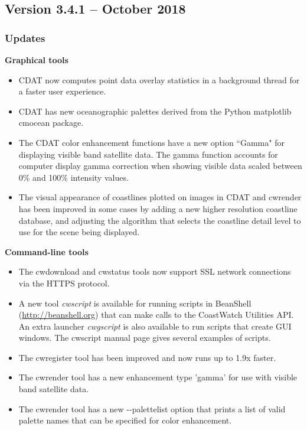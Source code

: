 \subsection*{Version 3.4.1 -- October 2018}

\subsubsection*{ Updates}

\hspace{0.4cm} {\bf Graphical tools}
\begin{itemize}

  \item CDAT now computes point data overlay statistics in a background thread
  for a faster user experience.

  \item CDAT has new oceanographic palettes derived from the Python matplotlib
  cmocean package.

  \item The CDAT color enhancement functions have a new option ``Gamma" for
  displaying visible band satellite data.  The gamma function accounts for
  computer display gamma correction when showing visible data scaled between
  0\% and 100\% intensity values.

  \item The visual appearance of coastlines plotted on images in CDAT and
  cwrender has been improved in some cases by adding a new higher
  resolution coastline database, and adjusting the algorithm that selects
  the coastline detail level to use for the scene being displayed.

\end{itemize}

\hspace{0.4cm} {\bf Command-line tools}
\begin{itemize}

    \item The cwdownload and cwstatus tools now support SSL network connections
    via the HTTPS protocol.

    \item A new tool {\em cwscript} is available for running scripts in
    BeanShell (\url{http://beanshell.org}) that can make calls to the
    CoastWatch Utilities API.  An extra launcher {\em cwgscript}
    is also available to run scripts that create GUI windows.  The cwscript
    manual page gives several examples of scripts.

    \item The cwregister tool has been improved and now runs up to 1.9x faster.

    \item The cwrender tool has a new enhancement type 'gamma' for use with
    visible band satellite data.

    \item The cwrender tool has a new -{-}palettelist option that prints a list
    of valid palette names that can be specified for color enhancement.

\end{itemize}


